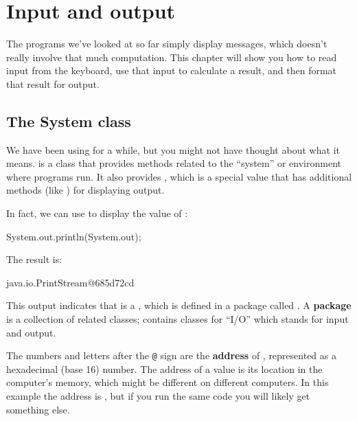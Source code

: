 \chapter{Input and output}

The programs we've looked at so far simply display messages, which doesn't really involve that much computation.
This chapter will show you how to read input from the keyboard, use that input to calculate a result, and then format that result for output.


\section{The System class}


We have been using  for a while, but you might not have thought about what it means.
 is a class that provides methods related to the ``system'' or environment where programs run.
It also provides , which is a special value that has additional methods (like ) for displaying output.


In fact, we can use  to display the value of :

\begin{code}
System.out.println(System.out);
\end{code}

The result is:

\begin{stdout}
java.io.PrintStream@685d72cd
\end{stdout}


This output indicates that  is a , which is defined in a package called .
A {\bf package} is a collection of related classes;  contains classes for ``I/O'' which stands for input and output.


The numbers and letters after the {\tt @} sign are the {\bf address} of , represented as a hexadecimal (base 16) number.
The address of a value is its location in the computer's memory, which might be different on different computers.
In this example the address is , but if you run the same code you will likely get something else.

